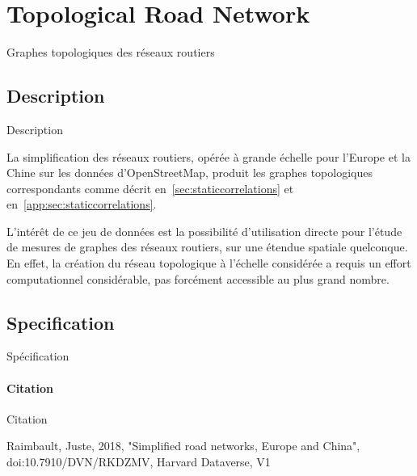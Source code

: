 








\section{Topological Road Network}{Graphes topologiques des réseaux routiers}


\subsection{Description}{Description}

La simplification des réseaux routiers, opérée à grande échelle pour l'Europe et la Chine sur les données d'OpenStreetMap, produit les graphes topologiques correspondants comme décrit en~\ref{sec:staticcorrelations} et en~\ref{app:sec:staticcorrelations}.

L'intérêt de ce jeu de données est la possibilité d'utilisation directe pour l'étude de mesures de graphes des réseaux routiers, sur une étendue spatiale quelconque. En effet, la création du réseau topologique à l'échelle considérée a requis un effort computationnel considérable, pas forcément accessible au plus grand nombre.




\subsection{Specification}{Spécification}

\paragraph{Citation}{Citation} 

Raimbault, Juste, 2018, "Simplified road networks, Europe and China", doi:10.7910/DVN/RKDZMV, Harvard Dataverse, V1


